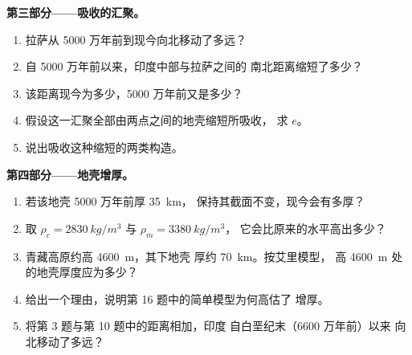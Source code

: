 \begin{problem}
\medskip
\noindent\textbf{第三部分——吸收的汇聚。}
\begin{enumerate}[resume]
  \item 拉萨从 5000 万年前到现今向北移动了多远？
  \item 自 5000 万年前以来，印度中部与拉萨之间的
        南北距离缩短了多少？
  \item 该距离现今为多少，5000 万年前又是多少？
  \item 假设这一汇聚全部由两点之间的地壳缩短所吸收，
        求 $e$。
  \item 说出吸收这种缩短的两类构造。
\end{enumerate}

\medskip
\noindent\textbf{第四部分——地壳增厚。}
\begin{enumerate}[resume]
  \item 若该地壳 5000 万年前厚 \qty{35}{km}，
        保持其截面不变，现今会有多厚？
  \item 取 $\rho_c = \qty{2830}{kg/m^3}$ 与 $\rho_m = \qty{3380}{kg/m^3}$，
        它会比原来的水平高出多少？
  \item 青藏高原约高 \qty{4600}{m}，其下地壳
        厚约 \qty{70}{km}。按艾里模型，
        高 \qty{4600}{m} 处的地壳厚度应为多少？
  \item 给出一个理由，说明第 16 题中的简单模型为何高估了
        增厚。
  \item 将第 3 题与第 10 题中的距离相加，印度
        自白垩纪末（6600 万年前）以来
        向北移动了多远？
\end{enumerate}
\end{problem}
